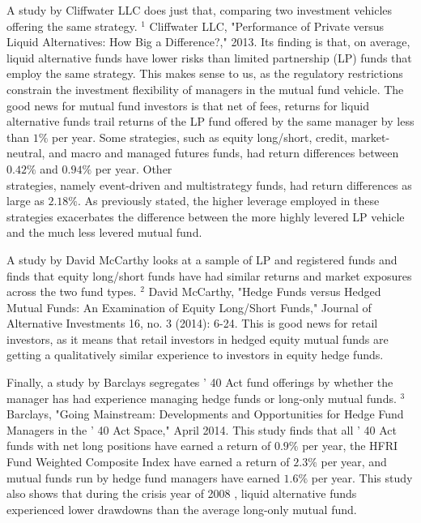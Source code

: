 \documentclass[11pt]{article}
\begin{document}
A study by Cliffwater LLC does just that, comparing two investment vehicles offering the same strategy. ${ }^{1}$ Cliffwater LLC, "Performance of Private versus Liquid Alternatives: How Big a Difference?," 2013. Its finding is that, on average, liquid alternative funds have lower risks than limited partnership (LP) funds that employ the same strategy. This makes sense to us, as the regulatory restrictions constrain the investment flexibility of managers in the mutual fund vehicle. The good news for mutual fund investors is that net of fees, returns for liquid alternative funds trail returns of the LP fund offered by the same manager by less than $1 \%$ per year. Some strategies, such as equity long/short, credit, market-neutral, and macro and managed futures funds, had return differences between $0.42 \%$ and $0.94 \%$ per year. Other\\
strategies, namely event-driven and multistrategy funds, had return differences as large as $2.18 \%$. As previously stated, the higher leverage employed in these strategies exacerbates the difference between the more highly levered LP vehicle and the much less levered mutual fund.

A study by David McCarthy looks at a sample of LP and registered funds and finds that equity long/short funds have had similar returns and market exposures across the two fund types. ${ }^{2}$ David McCarthy, "Hedge Funds versus Hedged Mutual Funds: An Examination of Equity Long/Short Funds," Journal of Alternative Investments 16, no. 3 (2014): 6-24. This is good news for retail investors, as it means that retail investors in hedged equity mutual funds are getting a qualitatively similar experience to investors in equity hedge funds.

Finally, a study by Barclays segregates ' 40 Act fund offerings by whether the manager has had experience managing hedge funds or long-only mutual funds. ${ }^{3}$ Barclays, "Going Mainstream: Developments and Opportunities for Hedge Fund Managers in the ' 40 Act Space," April 2014. This study finds that all ' 40 Act funds with net long positions have earned a return of $0.9 \%$ per year, the HFRI Fund Weighted Composite Index have earned a return of $2.3 \%$ per year, and mutual funds run by hedge fund managers have earned $1.6 \%$ per year. This study also shows that during the crisis year of 2008 , liquid alternative funds experienced lower drawdowns than the average long-only mutual fund.
\end{document}
